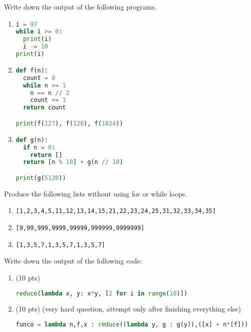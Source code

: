 \documentclass[addpoints,12pt]{exam}
\newcommand{\code}[1]{{\texttt{#1}}}
\begin{document}
\begin{questions}

\question[20]
Write down the output of the following programs.

\begin{enumerate}
  \item 
\begin{lstlisting}[language=python]
i = 97 
while i >= 0:
  print(i)
  i -= 10
print(i)
\end{lstlisting}
    \vfill

\item 
\begin{lstlisting}[language=python]
def f(n):
  count = 0
  while n >= 1
    n == n // 2
    count += 1
  return count

print(f(127), f(128), f(1024))
\end{lstlisting}

    \vfill

  \item 
\begin{lstlisting}[language=python]
def g(n):
  if n = 0:
    return [] 
  return [n % 10] + g(n // 10) 

print(g(5120))
\end{lstlisting}

    \vfill
\end{enumerate}

\newpage
\question[20] Produce the following lists without using for or while loops. 
\begin{enumerate}
  \item \code{[1,2,3,4,5,11,12,13,14,15,21,22,23,24,25,31,32,33,34,35]}
    \vfill
  \item \code{[9,99,999,9999,99999,999999,9999999]}
    \vfill
  \item \code{[1,3,5,7,1,3,5,7,1,3,5,7]}
    \vfill
\end{enumerate}

\newpage
\question[20] Write down the output of the following code:

\begin{enumerate}
  \item (10 pts) 
\begin{lstlisting}[language=python]
reduce(lambda x, y: x*y, [2 for i in range(10)])
\end{lstlisting}
\vfill
  \item (10 pts) (very hard question, attempt only after finishing everything else)
    \begin{lstlisting}[language=python] 
funco = lambda n,f,x : reduce((lambda y, g : g(y)),([x] + n*[f]))



\end{lstlisting}
\end{enumerate}
\end{questions}
\end{document}
